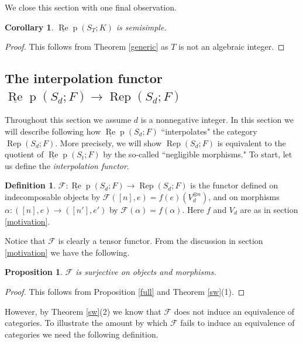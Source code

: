 \documentclass{amsart}
\newtheorem{proposition}[theorem]{Proposition}
\newtheorem{corollary}[theorem]{Corollary}
\theoremstyle{definition}
\newtheorem{definition}[theorem]{Definition}
\def\uRep{\underline{\operatorname{Re}}\!\operatorname{p}}
\newcommand{\Rep}{\operatorname{Rep}}
\renewcommand{\1}{_{(1)}}
\renewcommand{\2}{_{(2)}}
\newcommand{\3}{_{(3)}}
\newcommand{\4}{_{(4)}}
\newcommand{\cat}{\mathcal}
\begin{document}
We close this section with one final observation.

\begin{corollary}\label{ssT}  $\uRep(S_T; K)$ is semisimple.
\end{corollary}

\begin{proof} This follows from Theorem \ref{generic} as $T$ is not an algebraic integer.\end{proof}





\subsection{The interpolation functor $\uRep(S_d; F)\to \Rep(S_d; F)$}\label{interpolationSt} Throughout this section we assume $d$ is a nonnegative integer.
In this section we will describe following \cite[\S 6]{Del07} how $\uRep(S_d; F)$ ``interpolates" the category $\Rep(S_d; F)$.  More precisely, we will show $\Rep(S_d; F)$ is equivalent to the quotient of $\uRep(S_t; F)$ by the so-called ``negligible morphisms."  To start, let us define the \emph{interpolation functor}.

\begin{definition}\label{Ffunc} $\cat{F}: \uRep(S_d; F)\to  \Rep(S_d; F)$ is the functor defined on indecomposable objects by $\cat{F}([n], e)=f(e)(V_d^{\otimes n})$, and on morphisms $\alpha:([n], e)\to([n'], e')$ by $\cat{F}(\alpha)=f(\alpha)$.  Here $f$ and $V_d$ are as in section \ref{motivation}.
\end{definition}

Notice that $\cat{F}$ is clearly a tensor functor.  From the discussion in section \ref{motivation} we have the following.

\begin{proposition}\label{fully}  $\cat{F}$ is surjective on objects and morphisms.
\end{proposition}

\begin{proof}
This follows from Proposition \ref{full} and Theorem \ref{sw}(1).
\end{proof}

However, by Theorem \ref{sw}(2) we know that $\cat{F}$ does not induce an equivalence of categories.  To illustrate the amount by which $\cat{F}$ fails to induce an equivalence of categories we need the following definition.
\end{document}
